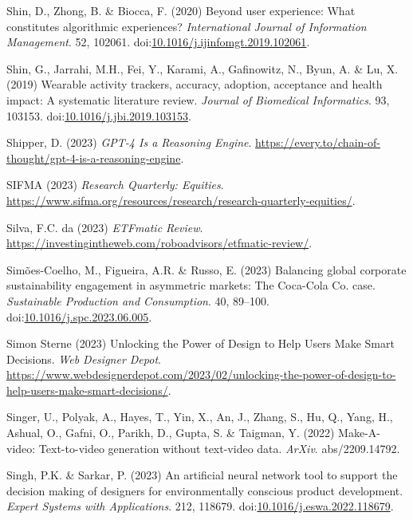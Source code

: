 \documentclass[
  letterpaper,
  DIV=11,
  numbers=noendperiod]{scrartcl}
\newlength{\cslhangindent}
\newenvironment{CSLReferences}[2] %
 {\begin{list}{}{%
  \setlength{\itemindent}{0pt}
  \setlength{\leftmargin}{0pt}
  \setlength{\parsep}{0pt}
  \ifodd #1
   \setlength{\leftmargin}{\cslhangindent}
   \setlength{\itemindent}{-1\cslhangindent}
  \fi
  \setlength{\itemsep}{#2\baselineskip}}}
 {\end{list}}
\begin{document}
\begin{CSLReferences}{0}{1}
Shin, D., Zhong, B. \& Biocca, F. (2020) Beyond user experience: {What}
constitutes algorithmic experiences? \emph{International Journal of
Information Management}. 52, 102061.
doi:\href{https://doi.org/10.1016/j.ijinfomgt.2019.102061}{10.1016/j.ijinfomgt.2019.102061}.

Shin, G., Jarrahi, M.H., Fei, Y., Karami, A., Gafinowitz, N., Byun, A.
\& Lu, X. (2019) Wearable activity trackers, accuracy, adoption,
acceptance and health impact: {A} systematic literature review.
\emph{Journal of Biomedical Informatics}. 93, 103153.
doi:\href{https://doi.org/10.1016/j.jbi.2019.103153}{10.1016/j.jbi.2019.103153}.

Shipper, D. (2023) \emph{{GPT-4 Is} a {Reasoning Engine}}.
\url{https://every.to/chain-of-thought/gpt-4-is-a-reasoning-engine}.

SIFMA (2023) \emph{Research {Quarterly}: {Equities}}.
\url{https://www.sifma.org/resources/research/research-quarterly-equities/}.

Silva, F.C. da (2023) \emph{{ETFmatic Review}}.
\url{https://investingintheweb.com/roboadvisors/etfmatic-review/}.

Simões-Coelho, M., Figueira, A.R. \& Russo, E. (2023) Balancing global
corporate sustainability engagement in asymmetric markets: {The
Coca-Cola Co}. case. \emph{Sustainable Production and Consumption}. 40,
89--100.
doi:\href{https://doi.org/10.1016/j.spc.2023.06.005}{10.1016/j.spc.2023.06.005}.

Simon Sterne (2023) Unlocking the {Power} of {Design} to {Help Users
Make Smart Decisions}. \emph{Web Designer Depot}.
\url{https://www.webdesignerdepot.com/2023/02/unlocking-the-power-of-design-to-help-users-make-smart-decisions/}.

Singer, U., Polyak, A., Hayes, T., Yin, X., An, J., Zhang, S., Hu, Q.,
Yang, H., Ashual, O., Gafni, O., Parikh, D., Gupta, S. \& Taigman, Y.
(2022) Make-{A-video}: {Text-to-video} generation without text-video
data. \emph{ArXiv}. abs/2209.14792.

Singh, P.K. \& Sarkar, P. (2023) An artificial neural network tool to
support the decision making of designers for environmentally conscious
product development. \emph{Expert Systems with Applications}. 212,
118679.
doi:\href{https://doi.org/10.1016/j.eswa.2022.118679}{10.1016/j.eswa.2022.118679}.


\end{CSLReferences}
\end{document}
